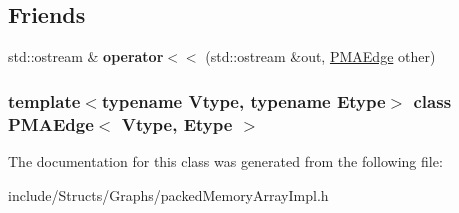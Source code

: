 \subsection*{Friends}
\begin{DoxyCompactItemize}
\item 
\hypertarget{class_p_m_a_edge_a1443cadf9731215d1fa7a2b12a0d5839}{
std::ostream \& {\bfseries operator$<$$<$} (std::ostream \&out, \hyperlink{class_p_m_a_edge}{PMAEdge} other)}
\label{class_p_m_a_edge_a1443cadf9731215d1fa7a2b12a0d5839}

\end{DoxyCompactItemize}
\subsubsection*{template$<$typename Vtype, typename Etype$>$ class PMAEdge$<$ Vtype, Etype $>$}



The documentation for this class was generated from the following file:\begin{DoxyCompactItemize}
\item 
include/Structs/Graphs/packedMemoryArrayImpl.h\end{DoxyCompactItemize}
